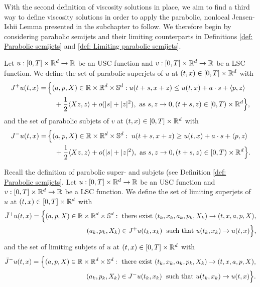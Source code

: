 With the second definition of viscosity solutions in place, we aim to find a third way to define viscosity solutions in order to apply the parabolic, nonlocal Jensen-Ishii Lemma presented in the subchapter to follow. We therefore begin by considering parabolic semijets and their limiting counterparts in Definitions \ref{def: Parabolic semijets} and \ref{def: Limiting parabolic semijets}. 

\begin{definition}
\label{def: Parabolic semijets}
    Let $u: [0,T] \times \mathbb{R}^d \rightarrow \mathbb{R}$ be an USC function and $v:[0,T] \times \mathbb{R}^d \rightarrow \mathbb{R}$ be a LSC function. We define the set of parabolic superjets of $u$ at $(t,x)\in [0,T]\times \mathbb{R}^d$ with
    \begin{align*}
        J^+ u(t,x) = \, & \Big\{(a,p,X) \in \mathbb{R} \times \mathbb{R}^d \times \mathbb S^d: u(t+s,x+z) 
        \leq u(t,x) + a\cdot s + \langle p,z \rangle \\
        & \quad + \frac 1 2 \langle Xz, z \rangle + o(|s| + |z|^2), \text{ as } s,z \rightarrow 0, (t+s,z) \in [0,T) \times \mathbb{R}^d \Big\},
    \end{align*}
    and the set of parabolic subjets of $v$ at $(t,x)\in [0,T]\times \mathbb{R}^d$ with
    \begin{align*}
         J^- u(t,x) = \, & \Big\{ (a,p,X) \in \mathbb{R} \times \mathbb{R}^d \times \mathbb S^d: \; u(t+s,x+z) \geq u(t,x) + a\cdot s + \langle p,z \rangle \\
         & \quad + \frac 1 2 \langle Xz, z \rangle + o(|s| + |z|^2), \text{ as } s,z \rightarrow 0, (t+s,z) \in [0,T) \times \mathbb{R}^d \Big\}.
    \end{align*}
\end{definition}

\begin{definition}
\label{def: Limiting parabolic semijets}
    Recall the definition of parabolic super- and subjets (see Definition \ref{def: Parabolic semijets}. Let $u: [0,T] \times \mathbb{R}^d \rightarrow \mathbb{R}$ be an USC function and $v:[0,T] \times \mathbb{R}^d \rightarrow \mathbb{R}$ be a LSC function. We define the set of limiting superjets of $u$ at $(t,x) \in [0,T] \times \mathbb{R}^d$ with
    \begin{align*}
        \bar J^+ u(t,x) = \Big\{ (a,p,X) \in \mathbb{R} \times \mathbb{R}^d \times \mathbb S^d: \text{ there exist } (t_k,x_k,a_k,p_k,X_k) \rightarrow (t,x,a,p,X), \\
        (a_k,p_k,X_k) \in J^+ u(t_k,x_k)  \; \text{ such that } u(t_k,x_k) \rightarrow u(t,x) \Big\},
    \end{align*}
    and the set of limiting subjets of $u$ at $(t,x) \in [0,T] \times \mathbb{R}^d$ with
    \begin{align*}
        \bar J^- u(t,x) = \Big\{ (a,p,X) \in \mathbb{R} \times \mathbb{R}^d \times \mathbb S^d: \text{ there exist } (t_k,x_k,a_k,p_k,X_k) \rightarrow (t,x,a,p,X), \\
        (a_k,p_k,X_k) \in J^- u(t_k,x_k)  \; \text{ such that } u(t_k,x_k) \rightarrow u(t,x) \Big\}.
    \end{align*}
\end{definition}

